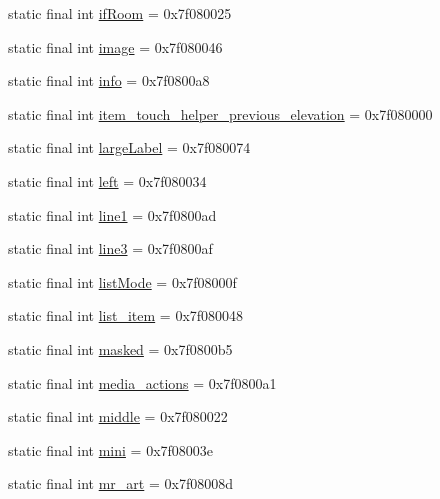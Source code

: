 \begin{CompactItemize}
static final int \hyperlink{classandroid_1_1support_1_1fragment_1_1_r_1_1id_6873d5276d0da31612ee07f7df3888a2}{ifRoom} = 0x7f080025
\item 
static final int \hyperlink{classandroid_1_1support_1_1fragment_1_1_r_1_1id_7e51cd185509c054f3bf0fa753a6b3ce}{image} = 0x7f080046
\item 
static final int \hyperlink{classandroid_1_1support_1_1fragment_1_1_r_1_1id_65f32b516ba1cd8be5289326629e63e6}{info} = 0x7f0800a8
\item 
static final int \hyperlink{classandroid_1_1support_1_1fragment_1_1_r_1_1id_8a8b8d04cd53b1ed5c15cd2f37ae4df1}{item\_\-touch\_\-helper\_\-previous\_\-elevation} = 0x7f080000
\item 
static final int \hyperlink{classandroid_1_1support_1_1fragment_1_1_r_1_1id_e59b09325c388466ce068620d68e43cf}{largeLabel} = 0x7f080074
\item 
static final int \hyperlink{classandroid_1_1support_1_1fragment_1_1_r_1_1id_e4d8a02a0dd47bdd13956335f53de067}{left} = 0x7f080034
\item 
static final int \hyperlink{classandroid_1_1support_1_1fragment_1_1_r_1_1id_9ba4e6abcc0d7b96fdede2d8cdbd6c20}{line1} = 0x7f0800ad
\item 
static final int \hyperlink{classandroid_1_1support_1_1fragment_1_1_r_1_1id_ae799a253f6b05e3545347ac5c605011}{line3} = 0x7f0800af
\item 
static final int \hyperlink{classandroid_1_1support_1_1fragment_1_1_r_1_1id_affc8a24fb1146feaad8d6b9f5ea8c27}{listMode} = 0x7f08000f
\item 
static final int \hyperlink{classandroid_1_1support_1_1fragment_1_1_r_1_1id_5f92fb677cc11fdc16f4ac858b32f021}{list\_\-item} = 0x7f080048
\item 
static final int \hyperlink{classandroid_1_1support_1_1fragment_1_1_r_1_1id_236ad66f7df9ff2041cfca769fc2d6fb}{masked} = 0x7f0800b5
\item 
static final int \hyperlink{classandroid_1_1support_1_1fragment_1_1_r_1_1id_6508658a3126426119a12505e5174829}{media\_\-actions} = 0x7f0800a1
\item 
static final int \hyperlink{classandroid_1_1support_1_1fragment_1_1_r_1_1id_ab1ee5173b9b849243138b99d1b4b230}{middle} = 0x7f080022
\item 
static final int \hyperlink{classandroid_1_1support_1_1fragment_1_1_r_1_1id_fdc83da9c03f76a6ca18fa6e084910a9}{mini} = 0x7f08003e
\item 
static final int \hyperlink{classandroid_1_1support_1_1fragment_1_1_r_1_1id_e2f62a12f9ee734b232c4f0e3400520c}{mr\_\-art} = 0x7f08008d

\end{CompactItemize}
